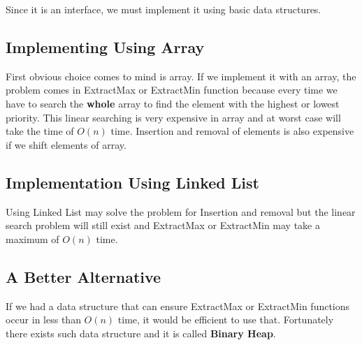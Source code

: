 Since it is an interface, we must implement it using basic data structures.
\subsection{Implementing Using Array}
First obvious choice comes to mind is array.
If we implement it with an array, the problem comes in ExtractMax or ExtractMin function because every time we have to search the \textbf{whole} array to find the element with the highest or lowest priority. This linear searching is very expensive in array and at worst case will take the time of $O(n)$ time. Insertion and removal of elements is also expensive if we shift elements of array. 
\subsection{Implementation Using Linked List}
Using Linked List may solve the problem for Insertion and removal but the linear search problem will still exist and ExtractMax or ExtractMin may take a maximum of $O(n)$ time.
\subsection{A Better Alternative}
If we had a data structure that can ensure ExtractMax or ExtractMin functions occur in less than $O(n)$ time, it would be efficient to use that. Fortunately there exists such data structure and it is called \textbf{Binary Heap}.
